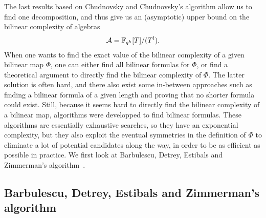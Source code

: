 The last results based on Chudnovsky and Chudnovsky's algorithm allow us to find
one decomposition, and thus give us an (asymptotic) upper bound on the bilinear
complexity of algebras
\[
  \mathcal{A} = \mathbb{F}_{q^k}[T]/(T^l).
\]
When one wants to find the exact value of the bilinear complexity of a given
bilinear map $\Phi$, one can either find all bilinear formulas for $\Phi$, or
find a theoretical argument to directly find the bilinear complexity of $\Phi$. The latter
solution is often hard, and there also exist some in-between approaches such
as finding a bilinear formula of a given length and proving that no shorter formula
could exist. Still, because it seems hard to directly find the bilinear
complexity of a bilinear map, algorithms were developped to find bilinear
formulas. These algorithms are essentially exhaustive searches, so they 
have an exponential complexity, but they also exploit the eventual symmetries
in the definition of $\Phi$ to eliminate a lot of potential candidates along the
way, in order to be as efficient as possible in practice. We first look at
Barbulescu, Detrey, Estibals and Zimmerman's algorithm~\cite{BDEZ12}.

\subsection{Barbulescu, Detrey, Estibals and Zimmerman's algorithm}

